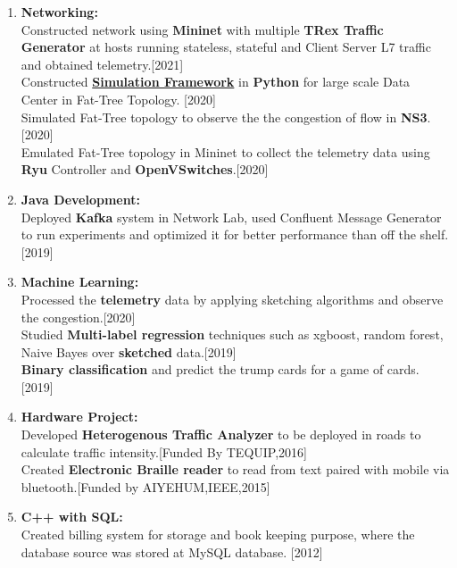 \documentclass[1pt]{article}
\newenvironment{outerlist}[1][\enskip\textbullet]%
        {\begin{enumerate}[#1]}{\end{enumerate}%
         \vspace{-1\baselineskip}}
\begin{document}
\begin{outerlist}
\item {\bf Networking:}\\
Constructed network using {\bf Mininet} with multiple {\bf TRex Traffic Generator} at hosts running stateless, stateful and Client Server L7 traffic and obtained telemetry.[2021]\\
Constructed {\bf \href{https://github.com/bidhovbizar/DCN-Simulation/tree/master/PythonCode}{Simulation Framework}} in {\bf Python} for large scale Data Center in Fat-Tree Topology. [2020]  \\ 
Simulated Fat-Tree topology to observe the the congestion of flow in {\bf NS3}.[2020]\\
Emulated Fat-Tree topology in Mininet to collect the telemetry data using {\bf Ryu} Controller and {\bf OpenVSwitches}.[2020]
\vspace{-6pt}
\item {\bf Java Development:} \\
Deployed {\bf Kafka} system in Network Lab, used Confluent Message Generator to run experiments and optimized it for better performance than off the shelf.[2019]
\vspace{-6pt}
\item {\bf Machine Learning:}\\
Processed the {\bf telemetry} data by applying sketching algorithms and observe the congestion.[2020]\\
 Studied {\bf Multi-label regression} techniques such as xgboost, random forest, Naive Bayes over {\bf sketched} data.[2019]\\
{\bf Binary classification } and predict the trump cards for a game of cards.[2019]
\vspace{-6pt}
\item {\bf Hardware Project:}\\
Developed {\bf Heterogenous Traffic Analyzer} to be deployed in roads to calculate traffic intensity.[Funded By TEQUIP,2016]\\
Created {\bf Electronic Braille reader} to read from text paired with mobile via bluetooth.[Funded by AIYEHUM,IEEE,2015]
\vspace{-6pt}
\item {\bf C++ with SQL:} \\
Created billing system for storage and book keeping purpose, where the database source was stored at MySQL database. [2012]
\end{outerlist}
\end{document}
